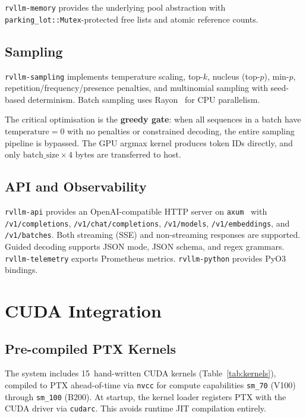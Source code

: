 \texttt{rvllm-memory} provides the underlying pool abstraction with
\texttt{parking\_lot::Mutex}-protected free lists and atomic reference counts.

\subsection{Sampling}

\texttt{rvllm-sampling} implements temperature scaling, top-$k$, nucleus (top-$p$),
min-$p$, repetition/frequency/presence penalties, and multinomial sampling with
seed-based determinism. Batch sampling uses Rayon~\cite{rayon2023} for CPU parallelism.

The critical optimisation is the \textbf{greedy gate}: when all sequences in a batch
have $\text{temperature} = 0$ with no penalties or constrained decoding, the entire
sampling pipeline is bypassed. The GPU argmax kernel produces token IDs directly,
and only $\text{batch\_size} \times 4$ bytes are transferred to host.

\subsection{API and Observability}

\texttt{rvllm-api} provides an OpenAI-compatible HTTP server on
\texttt{axum}~\cite{axum2023} with \texttt{/v1/completions},
\texttt{/v1/chat/completions}, \texttt{/v1/models}, \texttt{/v1/embeddings}, and
\texttt{/v1/batches}. Both streaming (SSE) and non-streaming responses are supported.
Guided decoding supports JSON mode, JSON schema, and regex grammars.
\texttt{rvllm-telemetry} exports Prometheus metrics. \texttt{rvllm-python} provides
PyO3 bindings.

\section{CUDA Integration}
\label{sec:cuda}

\subsection{Pre-compiled PTX Kernels}

The system includes 15~hand-written CUDA kernels (Table~\ref{tab:kernels}),
compiled to PTX ahead-of-time via \texttt{nvcc} for compute capabilities
\texttt{sm\_70} (V100) through \texttt{sm\_100} (B200). At startup, the kernel
loader registers PTX with the CUDA driver via \texttt{cudarc}. This avoids runtime
JIT compilation entirely.

